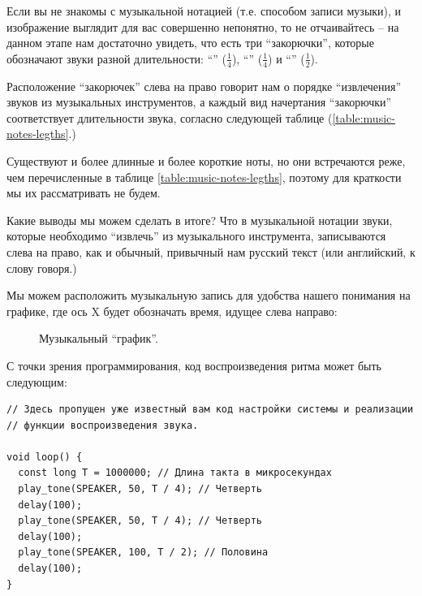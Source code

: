 \documentclass[../sparc.tex]{subfiles}
\begin{document}
Если вы не знакомы с музыкальной нотацией (т.е. способом записи музыки), и
изображение выглядит для вас совершенно непонятно, то не отчаивайтесь -- на
данном этапе нам достаточно увидеть, что есть три ``закорючки'', которые
обозначают звуки разной длительности: ``\quarterNote'' ($\frac{1}{4}$),
``\quarterNote'' ($\frac{1}{4}$) и ``\halfNote'' ($\frac{1}{2}$).

Расположение ``закорючек'' слева на право говорит нам о порядке ``извлечения''
звуков из музыкальных инструментов, а каждый вид начертания ``закорючки''
соответствует длительности звука, согласно следующей таблице
(\ref{table:music-notes-legths}.)


Существуют и более длинные и более короткие ноты, но они встречаются реже, чем
перечисленные в таблице \ref{table:music-notes-legths}, поэтому для краткости мы
их рассматривать не будем.

Какие выводы мы можем сделать в итоге? Что в музыкальной нотации звуки, которые
необходимо ``извлечь'' из музыкального инструмента, записываются слева на право,
как и обычный, привычный нам русский текст (или английский, к слову говоря.)

Мы можем расположить музыкальную запись для удобства нашего понимания на
графике, где ось $\mbox{X}$ будет обозначать время, идущее слева направо:

\begin{figure}[ht]
  \centering

  \caption{Музыкальный ``график''.}
  \label{fig:lilypond-musical-graph}
\end{figure}

С точки зрения программирования, код воспроизведения ритма может быть следующим:

\begin{verbatim}
// Здесь пропущен уже известный вам код настройки системы и реализации
// функции воспроизведения звука.

void loop() {
  const long T = 1000000; // Длина такта в микросекундах
  play_tone(SPEAKER, 50, T / 4); // Четверть
  delay(100);
  play_tone(SPEAKER, 50, T / 4); // Четверть
  delay(100);
  play_tone(SPEAKER, 100, T / 2); // Половина
  delay(100);
}
\end{verbatim}
\end{document}
